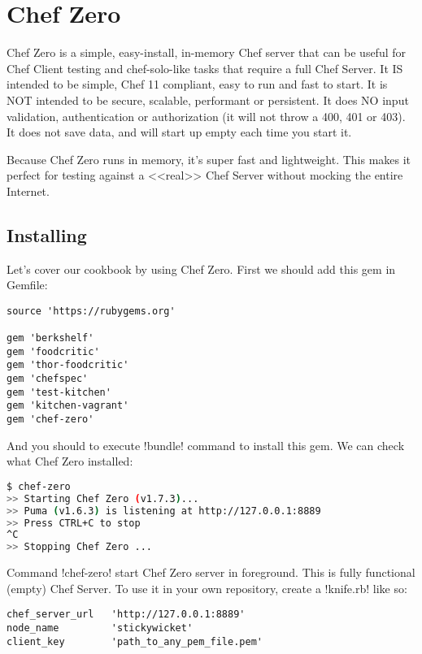 \section{Chef Zero}
\label{sec:testing-chef-zero}

Chef Zero is a simple, easy-install, in-memory Chef server that can be useful for Chef Client testing and chef-solo-like tasks that require a full Chef Server. It IS intended to be simple, Chef 11 compliant, easy to run and fast to start. It is NOT intended to be secure, scalable, performant or persistent. It does NO input validation, authentication or authorization (it will not throw a 400, 401 or 403). It does not save data, and will start up empty each time you start it.

Because Chef Zero runs in memory, it's super fast and lightweight. This makes it perfect for testing against a <<real>> Chef Server without mocking the entire Internet.

\subsection{Installing}

Let's cover our cookbook by using Chef Zero. First we should add this gem in Gemfile:

\begin{lstlisting}[label=lst:testing-chef-zero1]
source 'https://rubygems.org'

gem 'berkshelf'
gem 'foodcritic'
gem 'thor-foodcritic'
gem 'chefspec'
gem 'test-kitchen'
gem 'kitchen-vagrant'
gem 'chef-zero'
\end{lstlisting}

And you should to execute \inline!bundle! command to install this gem. We can check what Chef Zero installed:

\begin{lstlisting}[language=Bash,label=lst:testing-chef-zero2]
$ chef-zero
>> Starting Chef Zero (v1.7.3)...
>> Puma (v1.6.3) is listening at http://127.0.0.1:8889
>> Press CTRL+C to stop
^C
>> Stopping Chef Zero ...
\end{lstlisting}

Command \inline!chef-zero! start Chef Zero server in foreground. This is fully functional (empty) Chef Server. To use it in your own repository, create a \inline!knife.rb! like so:

\begin{lstlisting}[label=lst:testing-chef-zero3]
chef_server_url   'http://127.0.0.1:8889'
node_name         'stickywicket'
client_key        'path_to_any_pem_file.pem'
\end{lstlisting}

